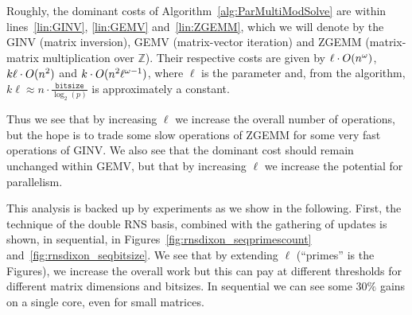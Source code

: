 Roughly, the dominant costs of Algorithm~\ref{alg:ParMultiModSolve}
are within lines~\ref{lin:GINV}, \ref{lin:GEMV} and~\ref{lin:ZGEMM},
which we will denote by the GINV (matrix inversion), GEMV
(matrix-vector iteration) and ZGEMM (matrix-matrix multiplication over
$\mathbb{Z}$).
Their respective costs are given by $\ell\cdot\GO{n^\omega}$,
$k\ell\cdot\GO{n^2}$ and $k\cdot\GO{n^2\ell^{\omega-1}}$,
where $\ell$ is the parameter and, from the algorithm, $k\ell\approx n \cdot
\frac{\texttt{bitsize}}{\log_2(p)}$ is approximately a constant.

Thus we see that by increasing $\ell$ we increase the overall number
of operations, but the hope is to trade some slow operations of ZGEMM
for some very fast operations of GINV. 
We also see that the dominant cost should remain unchanged within GEMV, but
that by increasing $\ell$ we increase the potential for
parallelism. 

This analysis is backed up by experiments as we show in the following.
%
First, the technique of the double RNS basis, combined with the
gathering of updates is shown, in sequential, in
Figures~\ref{fig:rnsdixon_seqprimescount}
and~\ref{fig:rnsdixon_seqbitsize}. We see that by extending $\ell$
(``primes'' is the Figures), we increase the overall work but this
can pay at different thresholds for different matrix dimensions and
bitsizes. In sequential we can see some $30\%$ gains on a single core,
even for small matrices.



